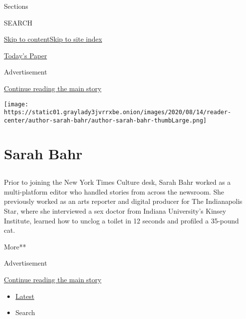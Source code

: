 Sections

SEARCH

\protect\hyperlink{site-content}{Skip to
content}\protect\hyperlink{site-index}{Skip to site index}

\href{https://myaccount.nytimes3xbfgragh.onion/auth/login?response_type=cookie\&client_id=vi}{}

\href{https://www.nytimes3xbfgragh.onion/section/todayspaper}{Today's
Paper}

Advertisement

\protect\hyperlink{after-top}{Continue reading the main story}

\texttt{[image: https://static01.graylady3jvrrxbe.onion/images/2020/08/14/reader-center/author-sarah-bahr/author-sarah-bahr-thumbLarge.png]}

\hypertarget{sarah-bahr}{%
\section{Sarah Bahr}\label{sarah-bahr}}

\subsection{}

Prior to joining the New York Times Culture desk, Sarah Bahr worked as a
multi-platform editor who handled stories from across the newsroom. She
previously worked as an arts reporter and digital producer for The
Indianapolis Star, where she interviewed a sex doctor from Indiana
University's Kinsey Institute, learned how to unclog a toilet in 12
seconds and profiled a 35-pound cat.

More**

Advertisement

\protect\hyperlink{after-mid1}{Continue reading the main story}

\begin{itemize}
\tightlist
\item
  \protect\hyperlink{stream-panel}{Latest}
\item
  Search
\end{itemize}

